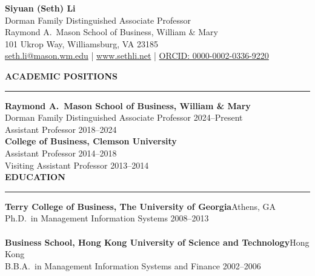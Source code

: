 \documentclass[11pt, letterpaper]{article}
\newcommand{\cvsection}[1]{%
  \vspace{14pt}%
  {\large\bfseries\color{headcolor}\MakeUppercase{#1}}%
  \vspace{2pt}\hrule\vspace{6pt}%
}
\newcommand{\cvsubsection}[2]{%
  \vspace{4pt}%
  {\bfseries #1}\hfill{\small #2}\\[-2pt]%
}
\begin{document}
\pagestyle{empty}

\begin{center}
  {\fontsize{22}{26}\selectfont\bfseries Siyuan (Seth) Li}\\[4pt]
  {\large Dorman Family Distinguished Associate Professor}\\[2pt]
  Raymond A.\ Mason School of Business, William \& Mary\\[5pt]
  {\small 101 Ukrop Way, Williamsburg, VA 23185}\\[2pt]
  {\small
    \href{mailto:seth.li@mason.wm.edu}{seth.li@mason.wm.edu}
    \quad|\quad
    \href{https://www.sethli.net}{www.sethli.net}
    \quad|\quad
    \href{https://orcid.org/0000-0002-0336-9220}{ORCID: 0000-0002-0336-9220}
  }
\end{center}

\cvsection{Academic Positions}

\cvsubsection{Raymond A.\ Mason School of Business, William \& Mary}{}
\hspace{1.5em}Dorman Family Distinguished Associate Professor \hfill 2024--Present\\
\hspace{1.5em}Assistant Professor \hfill 2018--2024\\[4pt]

\cvsubsection{College of Business, Clemson University}{}
\hspace{1.5em}Assistant Professor \hfill 2014--2018\\
\hspace{1.5em}Visiting Assistant Professor \hfill 2013--2014\\

\cvsection{Education}

\cvsubsection{Terry College of Business, The University of Georgia}{Athens, GA}
\hspace{1.5em}Ph.D.\ in Management Information Systems \hfill 2008--2013\\
\hspace{1.5em}{\small Advisor: Dr.\ Elena Karahanna}\\[4pt]

\cvsubsection{Business School, Hong Kong University of Science and Technology}{Hong Kong}
\hspace{1.5em}B.B.A.\ in Management Information Systems and Finance \hfill 2002--2006\\
\hspace{1.5em}{\small First Class Honors}\\
\end{document}
